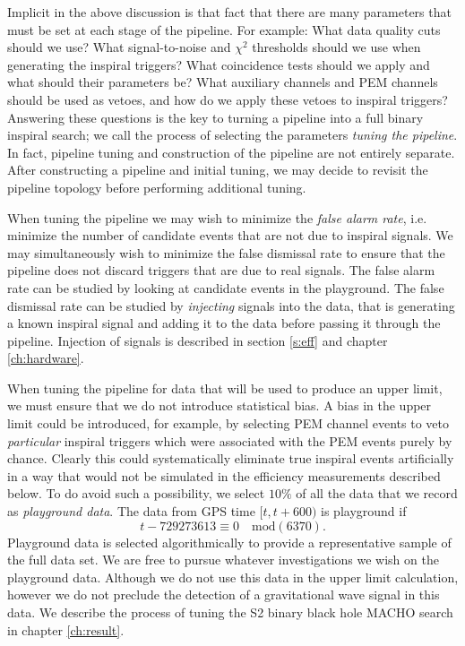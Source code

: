 Implicit in the above discussion is that fact that there are many parameters
that must be set at each stage of the pipeline. For example: What data quality
cuts should we use? What signal-to-noise and $\chi^2$ thresholds should we use
when generating the inspiral triggers? What coincidence tests should we apply
and what should their parameters be? What auxiliary channels and PEM channels
should be used as vetoes, and how do we apply these vetoes to inspiral
triggers? Answering these questions is the key to turning a pipeline into a
full binary inspiral search; we call the process of selecting the parameters
\emph{tuning the pipeline}. In fact, pipeline tuning and construction of the
pipeline are not entirely separate. After constructing a pipeline and initial
tuning, we may decide to revisit the pipeline topology before performing
additional tuning.

When tuning the pipeline we may wish to minimize the \emph{false alarm rate},
i.e. minimize the number of candidate events that are not due to inspiral
signals.  We may simultaneously wish to minimize the false dismissal rate to
ensure that the pipeline does not discard triggers that are due to real
signals.  The false alarm rate can be studied by looking at candidate events
in the playground. The false dismissal rate can be studied by \emph{injecting}
signals into the data, that is generating a known inspiral signal and adding
it to the data before passing it through the pipeline.  Injection of signals
is described in section \ref{s:eff} and chapter \ref{ch:hardware}.

When tuning the pipeline for data that will be used to produce an upper limit,
we must ensure that we do not introduce statistical bias. A bias in the upper
limit could be introduced, for example, by selecting PEM channel events to
veto \emph{particular} inspiral triggers which were associated with the  PEM
events purely by chance. Clearly this could systematically eliminate true
inspiral events artificially in a way that would not be simulated in the
efficiency measurements described below. To do avoid such a possibility, we
select $10\%$ of all the data that we record as \emph{playground data}. The
data from GPS time $[t,t+600)$ is playground if 
\begin{equation}
t - 729273613 \equiv 0 \quad \mathrm{mod}(6370).
\end{equation}
Playground data is selected algorithmically to provide a representative sample
of the full data set. We are free to pursue whatever investigations we
wish on the playground data. Although we do not use this data in the upper limit
calculation, however we do not preclude the detection of a gravitational wave
signal in this data. We describe the process of tuning the S2 binary black
hole MACHO search in chapter \ref{ch:result}.

